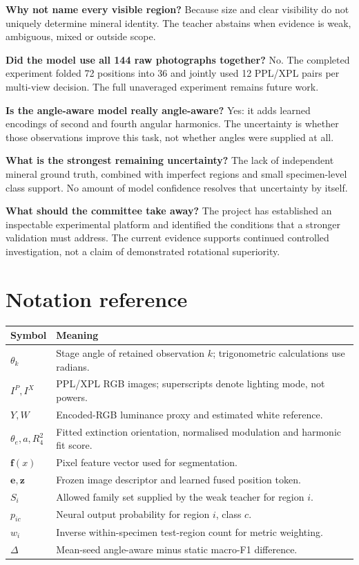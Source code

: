 \textbf{Why not name every visible region?} Because size and clear visibility do not uniquely determine mineral identity. The teacher abstains when evidence is weak, ambiguous, mixed or outside scope.

\textbf{Did the model use all 144 raw photographs together?} No. The completed experiment folded 72 positions into 36 and jointly used 12 PPL/XPL pairs per multi-view decision. The full unaveraged experiment remains future work.

\textbf{Is the angle-aware model really angle-aware?} Yes: it adds learned encodings of second and fourth angular harmonics. The uncertainty is whether those observations improve this task, not whether angles were supplied at all.

\textbf{What is the strongest remaining uncertainty?} The lack of independent mineral ground truth, combined with imperfect regions and small specimen-level class support. No amount of model confidence resolves that uncertainty by itself.

\textbf{What should the committee take away?} The project has established an inspectable experimental platform and identified the conditions that a stronger validation must address. The current evidence supports continued controlled investigation, not a claim of demonstrated rotational superiority.
\FloatBarrier

\appendix
\section{Notation reference}
\begin{tabularx}{\linewidth}{@{}lX@{}}\toprule Symbol & Meaning\\\midrule
$\theta_k$ & Stage angle of retained observation $k$; trigonometric calculations use radians.\\
$I^P,I^X$ & PPL/XPL RGB images; superscripts denote lighting mode, not powers.\\
$Y,W$ & Encoded-RGB luminance proxy and estimated white reference.\\
$\theta_e,a,R_4^2$ & Fitted extinction orientation, normalised modulation and harmonic fit score.\\
$\mathbf f(x)$ & Pixel feature vector used for segmentation.\\
$\mathbf e,\mathbf z$ & Frozen image descriptor and learned fused position token.\\
$S_i$ & Allowed family set supplied by the weak teacher for region $i$.\\
$p_{ic}$ & Neural output probability for region $i$, class $c$.\\
$w_i$ & Inverse within-specimen test-region count for metric weighting.\\
$\Delta$ & Mean-seed angle-aware minus static macro-F1 difference.\\\bottomrule
\end{tabularx}

